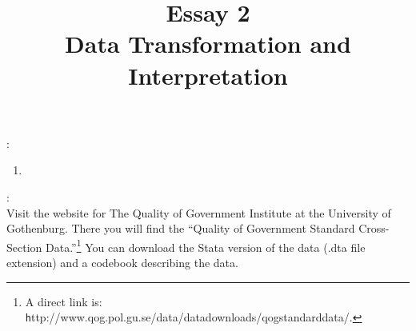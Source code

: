 \documentclass[a4paper,11pt]{article}
\title{Essay 2\\Data Transformation and Interpretation}
\author{}
\date{}
\begin{document}
\maketitle

\vspace{-3em}



\vspace{2em}

:
\begin{enumerate}
\item 
\end{enumerate}

:\\
Visit the website for The Quality of Government Institute at the University of Gothenburg. There you will find the ``Quality of Government Standard Cross-Section Data.''\footnote{A direct link is: {\texttt http://www.qog.pol.gu.se/data/datadownloads/qogstandarddata/}.} You can download the Stata version of the data (.dta file extension) and a codebook describing the data.
\end{document}
